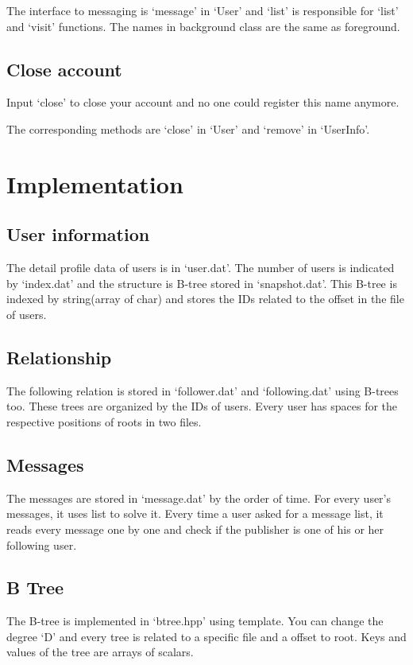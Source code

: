 \documentclass[a4paper, 11pt]{article}
\begin{document}
The interface to messaging is `message' in `User' and `list' is responsible for `list' and `visit' functions. The names in background class are the same as foreground.

\subsection{Close account}
Input `close' to close your account and no one could register this name anymore.

The corresponding methods are `close' in `User' and `remove' in `UserInfo'.

\section{Implementation}
\subsection{User information}
The detail profile data of users is in `user.dat'. The number of users is indicated by `index.dat' and the structure is B-tree stored in `snapshot.dat'. This B-tree is indexed by string(array of char) and stores the IDs related to the offset in the file of users.

\subsection{Relationship}
The following relation is stored in `follower.dat' and `following.dat' using B-trees too. These trees are organized by the IDs of users. Every user has spaces for the respective positions of roots in two files.

\subsection{Messages}
The messages are stored in `message.dat' by the order of time. For every user's messages, it uses list to solve it. Every time a user asked for a message list, it reads every message one by one and check if the publisher is one of his or her following user.

\subsection{B Tree}
The B-tree is implemented in `btree.hpp' using template. You can change the degree `D' and every tree is related to a specific file and a offset to root. Keys and values of the tree are arrays of scalars.
\end{document}
